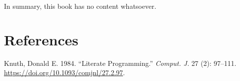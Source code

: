 \documentclass[
  letterpaper,
  paper=6in:9in,pagesize=pdftex,footinclude=on,11pt]{scrreprt}
\newlength{\cslhangindent}
\newenvironment{CSLReferences}[2] %
 {\begin{list}{}{%
  \setlength{\itemindent}{0pt}
  \setlength{\leftmargin}{0pt}
  \setlength{\parsep}{0pt}
  \ifodd #1
   \setlength{\leftmargin}{\cslhangindent}
   \setlength{\itemindent}{-1\cslhangindent}
  \fi
  \setlength{\itemsep}{#2\baselineskip}}}
 {\end{list}}
\begin{document}
In summary, this book has no content whatsoever.


\chapter*{References}\label{references}


\label{refs}
\begin{CSLReferences}{1}{0}
Knuth, Donald E. 1984. {``Literate Programming.''} \emph{Comput. J.} 27
(2): 97--111. \url{https://doi.org/10.1093/comjnl/27.2.97}.

\end{CSLReferences}



\printindex
\end{document}
